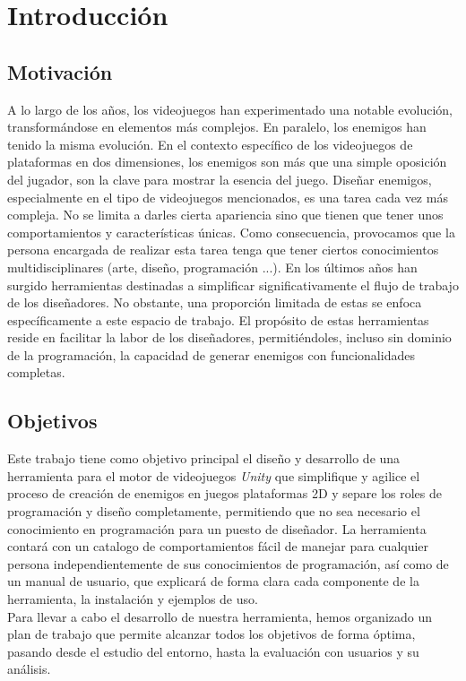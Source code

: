 \chapter{Introducción}
\label{cap:introduccion}


\section{Motivación}
A lo largo de los años, los videojuegos han experimentado una notable evolución, transformándose en elementos más complejos. En paralelo, los enemigos han tenido la misma evolución. En el contexto específico de los videojuegos de plataformas en dos dimensiones, los enemigos son más que una simple oposición del jugador, son la clave para mostrar la esencia del juego. Diseñar enemigos, especialmente en el tipo de videojuegos mencionados, es una tarea cada vez más compleja. No se limita a darles cierta apariencia sino que tienen que tener unos comportamientos y características únicas. Como consecuencia, provocamos que la persona encargada de realizar esta tarea tenga que tener ciertos conocimientos multidisciplinares (arte, diseño, programación ...). 
En los últimos años han surgido herramientas destinadas a simplificar significativamente el flujo de trabajo de los diseñadores. No obstante, una proporción limitada de estas se enfoca específicamente a este espacio de trabajo. El propósito de estas herramientas reside en facilitar la labor de los diseñadores, permitiéndoles, incluso sin dominio de la programación, la capacidad de generar enemigos con funcionalidades completas.

\section{Objetivos}
Este trabajo tiene como objetivo principal el diseño y desarrollo de una herramienta para el motor de videojuegos \textit{Unity} que simplifique y agilice el proceso de creación de enemigos en juegos plataformas 2D y separe los roles de programación y diseño completamente, permitiendo que no sea necesario el conocimiento en programación para un puesto de diseñador.
La herramienta contará con un catalogo de comportamientos fácil de manejar para cualquier persona independientemente de sus conocimientos de programación, así como de un manual de usuario, que explicará de forma clara cada componente de la herramienta, la instalación y ejemplos de uso. \\
Para llevar a cabo el desarrollo de nuestra herramienta, hemos organizado un plan de trabajo que permite alcanzar todos los objetivos de forma óptima, pasando desde el estudio del entorno, hasta la evaluación con usuarios y su análisis.


